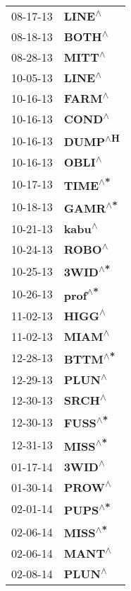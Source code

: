 \begin{supertabular}{p{0.08\textwidth}p{0.2\textwidth}}
 08-17-13 &    \textbf{LINE\textsuperscript{$\wedge$}} \\
 08-18-13 &    \textbf{BOTH\textsuperscript{$\wedge$}} \\
 08-28-13 &    \textbf{MITT\textsuperscript{$\wedge$}} \\
 10-05-13 &    \textbf{LINE\textsuperscript{$\wedge$}} \\
 10-16-13 &    \textbf{FARM\textsuperscript{$\wedge$}} \\
 10-16-13 &    \textbf{COND\textsuperscript{$\wedge$}} \\
 10-16-13 &   \textbf{DUMP\textsuperscript{$\wedge$H}} \\
 10-16-13 &    \textbf{OBLI\textsuperscript{$\wedge$}} \\
 10-17-13 &   \textbf{TIME\textsuperscript{$\wedge$*}} \\
 10-18-13 &   \textbf{GAMR\textsuperscript{$\wedge$*}} \\
 10-21-13 &    \textbf{kabu\textsuperscript{$\wedge$}} \\
 10-24-13 &    \textbf{ROBO\textsuperscript{$\wedge$}} \\
 10-25-13 &   \textbf{3WID\textsuperscript{$\wedge$*}} \\
 10-26-13 &   \textbf{prof\textsuperscript{$\wedge$*}} \\
 11-02-13 &    \textbf{HIGG\textsuperscript{$\wedge$}} \\
 11-02-13 &    \textbf{MIAM\textsuperscript{$\wedge$}} \\
 12-28-13 &   \textbf{BTTM\textsuperscript{$\wedge$*}} \\
 12-29-13 &    \textbf{PLUN\textsuperscript{$\wedge$}} \\
 12-30-13 &    \textbf{SRCH\textsuperscript{$\wedge$}} \\
 12-30-13 &   \textbf{FUSS\textsuperscript{$\wedge$*}} \\
 12-31-13 &   \textbf{MISS\textsuperscript{$\wedge$*}} \\
 01-17-14 &    \textbf{3WID\textsuperscript{$\wedge$}} \\
 01-30-14 &    \textbf{PROW\textsuperscript{$\wedge$}} \\
 02-01-14 &   \textbf{PUPS\textsuperscript{$\wedge$*}} \\
 02-06-14 &   \textbf{MISS\textsuperscript{$\wedge$*}} \\
 02-06-14 &    \textbf{MANT\textsuperscript{$\wedge$}} \\
 02-08-14 &    \textbf{PLUN\textsuperscript{$\wedge$}} \\

\end{supertabular}

